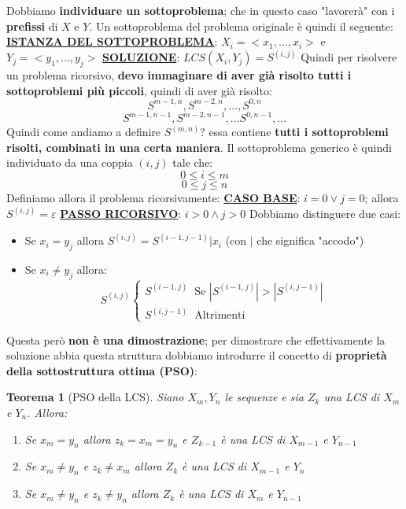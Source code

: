 \documentclass[12pt]{article}
\newtheorem{Teorema}{Teorema}[subsection]
\begin{document}
Dobbiamo \textbf{individuare un sottoproblema}; che in questo caso "lavorerà" con i \textbf{prefissi}
di $X$ e $Y$. Un sottoproblema del problema originale è quindi il seguente: \newline
\textbf{\underline{ISTANZA DEL SOTTOPROBLEMA}}: $X_i = <x_1,...,x_i>$ e $Y_j = <y_1,...,y_j>$ \newline
\textbf{\underline{SOLUZIONE}}: $LCS(X_i, Y_j) = S^{(i,j)}$ \newline
Quindi per risolvere un problema ricorsivo, \textbf{devo immaginare di aver già risolto tutti i sottoproblemi più piccoli}, quindi di aver già risolto:
$$S^{m-1, n}, S^{m-2, n}, \dots, S^{0, n}$$
$$S^{m-1, n-1}, S^{m-2, n-1}, \dots S^{0, n-1}, \dots$$
Quindi come andiamo a definire $S^{(m, n)}$?
essa contiene \textbf{tutti i sottoproblemi risolti, combinati in una certa maniera}. \newline
Il sottoproblema generico è quindi individuato da una coppia $(i,j)$ tale che:
$$0 \leq i \leq m$$
$$0 \leq j \leq n$$
Definiamo allora il problema ricorsivamente: \newline
\textbf{\underline{CASO BASE}}: $i = 0 \vee j = 0$; allora 
$S^{(i,j)} = \varepsilon$ \newline
\textbf{\underline{PASSO RICORSIVO}}: $i > 0 \land j > 0$ \newline
Dobbiamo distinguere due casi:
\begin{itemize}
    \item Se $x_i = y_j$ allora $S^{(i,j)} = S^{(i-1, j-1)}|x_i$ (con $|$ che significa "accodo")
    \item Se $x_i \neq y_j$ allora:
    $$S^{(i,j)}\begin{cases}
        S^{(i-1, j)} \; \; \textrm{Se } |S^{(i-1, j)}| > |S^{(i, j-1)}| \\
        S^{(i, j-1)} \; \; \textrm{Altrimenti}
    \end{cases}$$
\end{itemize}
Questa però \textbf{non è una dimostrazione}; per dimostrare che effettivamente la soluzione abbia questa struttura dobbiamo introdurre il
concetto di \textbf{proprietà della sottostruttura ottima (PSO)}:
\begin{Teorema}[PSO della LCS]
    Siano $X_m, Y_n$ le sequenze e sia $Z_k$ una LCS di $X_m$ e $Y_n$. Allora:
    \begin{enumerate}
        \item Se $x_m = y_n$ allora $z_k = x_m = y_n$ e $Z_{k-1}$ è una LCS di $X_{m-1}$ e $Y_{n-1}$
        \item Se $x_m \neq y_n$ e $z_k \neq x_m$ allora $Z_k$ è una LCS di $X_{m-1}$ e $Y_n$
        \item Se $x_m \neq y_n$ e $z_k \neq y_n$ allora $Z_k$ è una LCS di $X_m$ e $Y_{n-1}$
    \end{enumerate}
\end{Teorema}
\end{document}
